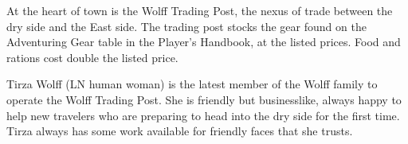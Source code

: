 At the heart of town is the Wolff Trading Post, the nexus of trade between the dry side and the East side.
The trading post stocks the gear found on the Adventuring Gear table in the Player's Handbook, at the listed prices.
Food and rations cost double the listed price.

Tirza Wolff (LN human woman) is the latest member of the Wolff family to operate the Wolff Trading Post.
She is friendly but businesslike, always happy to help new travelers who are preparing to head into the dry side for the first time.
Tirza always has some work available for friendly faces that she trusts.
